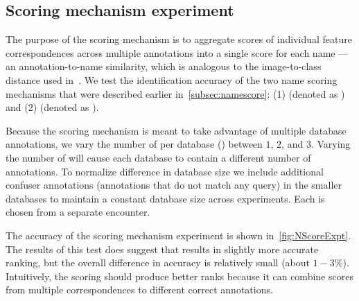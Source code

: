         \kptstype{}

    \subsection{Scoring mechanism experiment}\label{sub:exptscoremech}  


        The purpose of the scoring mechanism is to aggregate scores of individual feature correspondences across
          multiple annotations into a single score for each name --- \ie{} an annotation-to-name similarity, which
          is analogous to the image-to-class distance used in~\cite{boiman_defense_2008}.
        We test the identification accuracy of the two name scoring mechanisms that were described earlier
          in~\cref{subsec:namescore}:
        (1) \cscoring{} (denoted as \csum{}) and
        (2) \nscoring{} (denoted as \nsum{}).

        \NScoreExpt{}

        Because the scoring mechanism is meant to take advantage of multiple database annotations, we vary the
          number of \exemplars{} per database \name{} () between $1$, $2$, and $3$.
        Varying the number of \exemplars{} will cause each database to contain a different number of annotations.
        To normalize difference in database size we include additional confuser annotations (annotations that do
          not match any query) in the smaller databases to maintain a constant database size across experiments.
        Each \exemplar{} is chosen from a separate encounter.

        The accuracy of the scoring mechanism experiment is shown in~\cref{fig:NScoreExpt}.
        The results of this test does suggest that \nsum{} results in slightly more accurate ranking, but the
          overall difference in accuracy is relatively small (about $1-3\percent$).
        Intuitively, the \nsum{} scoring should produce better ranks because it can combine scores from multiple
          correspondences to different correct annotations.

